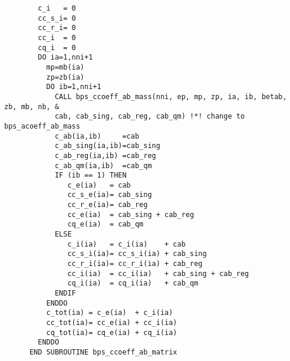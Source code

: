 \documentclass[preprint,12pt,eqsecnum,nofootinbib,amsmath,amssymb]{revtex4}
\begin{document}
{\begin{verbatim}
        c_i   = 0
        cc_s_i= 0
        cc_r_i= 0
        cc_i  = 0
        cq_i  = 0
        DO ia=1,nni+1
          mp=mb(ia)
          zp=zb(ia)
          DO ib=1,nni+1
            CALL bps_ccoeff_ab_mass(nni, ep, mp, zp, ia, ib, betab, zb, mb, nb, &
            cab, cab_sing, cab_reg, cab_qm) !*! change to bps_acoeff_ab_mass
            c_ab(ia,ib)     =cab
            c_ab_sing(ia,ib)=cab_sing
            c_ab_reg(ia,ib) =cab_reg
            c_ab_qm(ia,ib)  =cab_qm 
            IF (ib == 1) THEN
               c_e(ia)   = cab 
               cc_s_e(ia)= cab_sing
               cc_r_e(ia)= cab_reg
               cc_e(ia)  = cab_sing + cab_reg
               cq_e(ia)  = cab_qm
            ELSE
               c_i(ia)   = c_i(ia)    + cab 
               cc_s_i(ia)= cc_s_i(ia) + cab_sing
               cc_r_i(ia)= cc_r_i(ia) + cab_reg
               cc_i(ia)  = cc_i(ia)   + cab_sing + cab_reg
               cq_i(ia)  = cq_i(ia)   + cab_qm
            ENDIF
          ENDDO
          c_tot(ia) = c_e(ia)  + c_i(ia)
          cc_tot(ia)= cc_e(ia) + cc_i(ia)
          cq_tot(ia)= cq_e(ia) + cq_i(ia)
        ENDDO
      END SUBROUTINE bps_ccoeff_ab_matrix
\end{verbatim}

}
\end{document}
